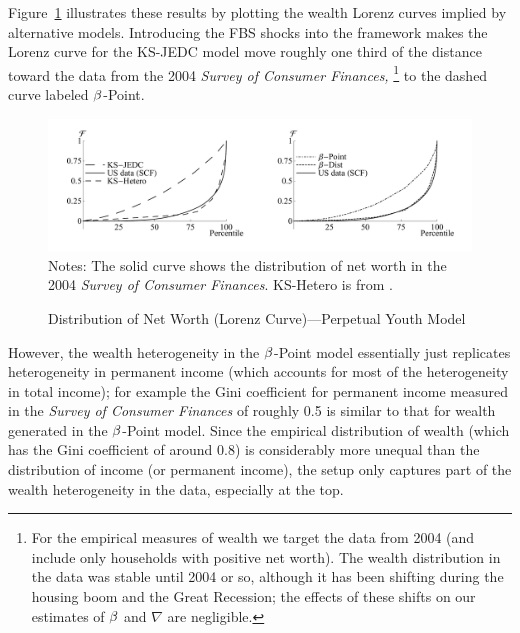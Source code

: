 \documentclass[12pt,titlepage]{econtex}
\begin{document}
Figure~\ref{CumWLevSCFCastanedaAndDistSevenNoAggShockPlot}
illustrates these results by plotting the wealth Lorenz curves
implied by alternative models. Introducing the FBS shocks into the
framework makes the Lorenz curve for the KS-JEDC  model move roughly
one third of the distance toward the data from the 2004 \emph{Survey of
Consumer Finances,}%
\footnote{%
For the empirical measures of wealth we target the data from 2004 (and include only households with positive net worth). The wealth distribution in the data was stable until 2004 or so, although it has been shifting
during the housing boom and the Great Recession; the effects of these shifts on our estimates of
 $\beta$ and $\nabla$ are negligible.
}
 to the dashed curve labeled $\beta$-Point.

\begin{figure}
\caption{Distribution of Net Worth (Lorenz Curve)---Perpetual Youth Model}
\label{CumWLevSCFCastanedaAndDistSevenNoAggShockPlot}
\includegraphics[width=1.00\textwidth]{../Figures/CumWLevSCFCastanedaAndDistSevenNoAggShockLRPlot}
\footnotesize Notes: The solid curve shows the distribution of net worth in the 2004 \emph{Survey of Consumer Finances}. KS-Hetero is from \citet{ksHetero}.
\end{figure}

However, the wealth heterogeneity in the $\beta$-Point model essentially just replicates heterogeneity in permanent income (which accounts for most of the heterogeneity in total income); for example the Gini coefficient for permanent income measured in the \emph{Survey of Consumer Finances} of roughly 0.5 is similar to that for wealth generated in the $\beta$-Point model.  Since the empirical distribution of wealth (which has the Gini coefficient of around 0.8) is considerably more unequal than the distribution of income (or permanent income), the setup only captures part of the wealth heterogeneity in the data, especially at the top.
\end{document}
